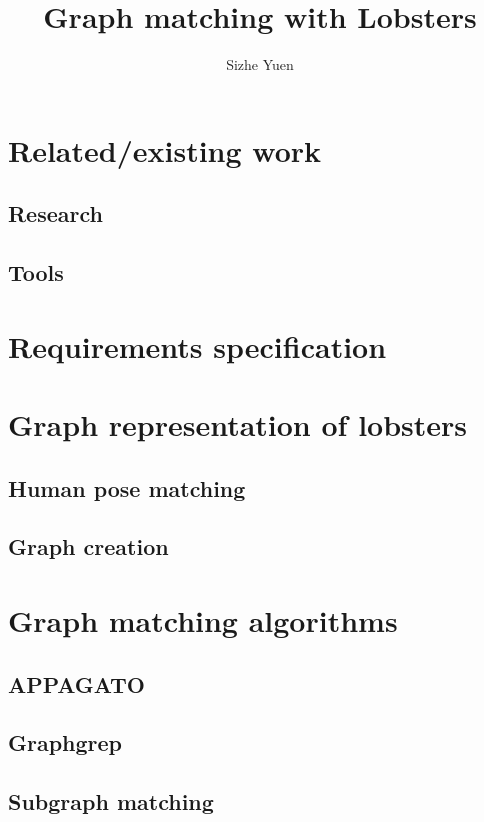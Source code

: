 \documentclass{article}
\title{Graph matching with Lobsters}
\author{Sizhe Yuen}
\begin{document}


\tableofcontents



\section{Related/existing work}

\subsection{Research}

\subsection{Tools}

\section{Requirements specification}



\section{Graph representation of lobsters}

\subsection{Human pose matching}

\subsection{Graph creation}

\section{Graph matching algorithms}

\subsection{APPAGATO}

\subsection{Graphgrep}

\subsection{Subgraph matching}
\end{document}
